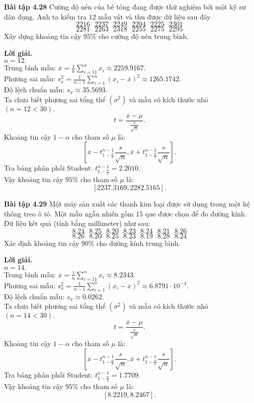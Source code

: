 \documentclass[12pt,a4paper]{article}
\begin{document}
\begin{mybox}
\textbf{Bài tập 4.28} Cường độ nén của bê tông đang được thử nghiệm bởi một kỹ sư dân dụng. Anh ta kiểm tra $12$ mẫu vật và thu được dữ liệu sau đây
$$2216 \text{ } 2237 \text{ }  2249 \text{ }  2204 \text{ }  2225 \text{ }  2301$$
$$2281 \text{ } 2263 \text{ } 2318 \text{ } 2255 \text{ } 2275 \text{ } 2295$$
Xây dựng khoảng tin cậy $95\%$ cho cường độ nén trung bình.
\end{mybox}
\textbf{Lời giải.} \\
$n = 12.$\\
Trung bình mẫu:
$\overline x  = \frac{1}{n}\sum\limits_{i =1 1}^n {{x_i}}  \approx 2259.9167.$\\
Phương sai mẫu: $s_x^2 = \frac{1}{{n - 1}}\sum\limits_{i = 1}^n {{{\left( {{x_i} - \overline x } \right)}^2}}  \approx 1265.1742.$\\
Độ lệch chuẩn mẫu: ${s_x} \approx 35.5693.$\\
Ta chưa biết phương sai tổng thể $\left( {\sigma^2} \right)$ và mẫu có kích thước nhỏ $\left( {n = 12 < 30} \right).$
$$t = \frac{\overline{x} - \mu}{\frac{s}{\sqrt{n}}}.$$
Khoảng tin cậy $1 - \alpha$ cho tham số $\mu$ là:
$$\left[ {\overline x  - t_{1 - \frac{\alpha }{2}}^{n - 1}\frac{s}{{\sqrt n }},\overline x  + t_{1 - \frac{\alpha }{2}}^{n - 1}\frac{s}{{\sqrt n }}} \right].$$
Tra bảng phân phối Student: $t_{1 - \frac{\alpha }{2}}^{n - 1} = 2.2010.$\\
Vậy khoảng tin cậy $95\%$ cho tham số $\mu$ là:
$$\left[ {2237.3169, 2282.5165} \right].$$   

\begin{mybox}
\textbf{Bài tập 4.29} Một máy sản xuất các thanh kim loại được sử dụng trong một hệ thống treo ô tô. Một mẫu ngẫu nhiên gồm $15$ que được chọn để đo đường kính. Dữ liệu kết quả (tính bằng millimeter) như sau:
$$8.24 \text{ } 8.25 \text{ } 8.20 \text{ } 8.23 \text{ } 8.24 \text{ } 8.21 \text{ } 8.26$$
$$8.26 \text{ } 8.20 \text{ } 8.25 \text{ } 8.23 \text{ } 8.19 \text{ } 8.28 \text{ } 8.24$$
Xác định khoảng tin cậy $90\%$ cho đường kính trung bình.
\end{mybox}
\textbf{Lời giải.} \\
$n = 14.$\\
Trung bình mẫu:
$\overline x  = \frac{1}{n}\sum\limits_{i =1 1}^n {{x_i}}  \approx 8.2343.$\\
Phương sai mẫu: $s_x^2 = \frac{1}{{n - 1}}\sum\limits_{i = 1}^n {{{\left( {{x_i} - \overline x } \right)}^2}}  \approx 6.8791 \cdot 10^{-4}.$\\
Độ lệch chuẩn mẫu: ${s_x} \approx 0.0262.$\\
Ta chưa biết phương sai tổng thể $\left( {\sigma^2} \right)$ và mẫu có kích thước nhỏ $\left( {n = 14 < 30} \right).$
$$t = \frac{\overline{x} - \mu}{\frac{s}{\sqrt{n}}}.$$
Khoảng tin cậy $1 - \alpha$ cho tham số $\mu$ là:
$$\left[ {\overline x  - t_{1 - \frac{\alpha }{2}}^{n - 1}\frac{s}{{\sqrt n }},\overline x  + t_{1 - \frac{\alpha }{2}}^{n - 1}\frac{s}{{\sqrt n }}} \right].$$
Tra bảng phân phối Student: $t_{1 - \frac{\alpha }{2}}^{n - 1} = 1.7709.$\\
Vậy khoảng tin cậy $95\%$ cho tham số $\mu$ là:
$$\left[ {8.2219,8.2467} \right].$$   
\end{document}
